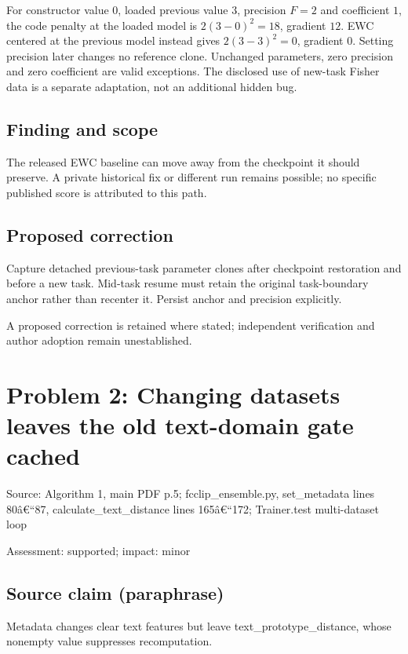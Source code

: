 \documentclass[11pt]{article}
\begin{document}
For constructor value \(0\), loaded previous value \(3\), precision \(F=2\) and coefficient \(1\), the code penalty at the loaded model is \(2(3-0)^2=18\), gradient \(12\). EWC centered at the previous model instead gives \(2(3-3)^2=0\), gradient \(0\). Setting precision later changes no reference clone. Unchanged parameters, zero precision and zero coefficient are valid exceptions. The disclosed use of new-task Fisher data is a separate adaptation, not an additional hidden bug.

\subsection*{Finding and scope}

The released EWC baseline can move away from the checkpoint it should preserve. A private historical fix or different run remains possible; no specific published score is attributed to this path.

\subsection*{Proposed correction}

Capture detached previous-task parameter clones after checkpoint restoration and before a new task. Mid-task resume must retain the original task-boundary anchor rather than recenter it. Persist anchor and precision explicitly.

A proposed correction is retained where stated; independent verification and author adoption remain unestablished.

\section*{Problem 2: Changing datasets leaves the old text-domain gate cached}

Source: Algorithm 1, main PDF p.5; fcclip\_ensemble.py, set\_metadata lines 80â€“87, calculate\_text\_distance lines 165â€“172; Trainer.test multi-dataset loop

Assessment: supported; impact: minor

\subsection*{Source claim (paraphrase)}

Metadata changes clear text features but leave text\_prototype\_distance, whose nonempty value suppresses recomputation.
\end{document}
